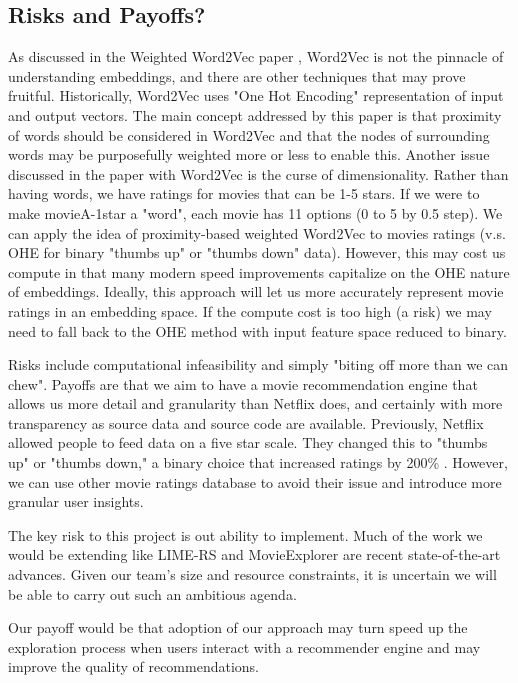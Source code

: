 \subsection{Risks and Payoffs?}

As discussed in the Weighted Word2Vec paper \cite{chang2017weighted}, Word2Vec is not the pinnacle of understanding embeddings, and there are other techniques that may prove fruitful. Historically, Word2Vec uses "One Hot Encoding" representation of input and output vectors. The main concept addressed by this paper is that proximity of words should be considered in Word2Vec and that the nodes of surrounding words may be purposefully weighted more or less to enable this. Another issue discussed in the paper with Word2Vec is the curse of dimensionality. Rather than having words, we have ratings for movies that can be 1-5 stars. If we were to make movieA-1star a "word", each movie has 11 options (0 to 5 by 0.5 step). We can apply the idea of proximity-based weighted Word2Vec to movies ratings (v.s. OHE for binary "thumbs up" or "thumbs down" data). However, this may cost us compute in that many modern speed improvements capitalize on the OHE nature of embeddings. Ideally, this approach will let us more accurately represent movie ratings in an embedding space. If the compute cost is too high (a risk) we may need to fall back to the OHE method with input feature space reduced to binary.

Risks include computational infeasibility and simply "biting off more than we can chew". Payoffs are that we aim to have a movie recommendation engine that allows us more detail and granularity than Netflix does, and certainly with more transparency as source data and source code are available. Previously, Netflix allowed people to feed data on a five star scale. They changed this to "thumbs up" or "thumbs down," a binary choice that increased ratings by 200\% \cite{Netflixh3:online}. However, we can use other movie ratings database to avoid their issue and introduce more granular user insights.

The key risk to this project is out ability to implement. Much of the work we would be extending like LIME-RS and MovieExplorer are recent state-of-the-art advances. Given our team's size and resource constraints, it is uncertain we will be able to carry out such an ambitious agenda. 

Our payoff would be that adoption of our approach may turn speed up the exploration process when users interact with a recommender engine and may improve the quality of recommendations. 
